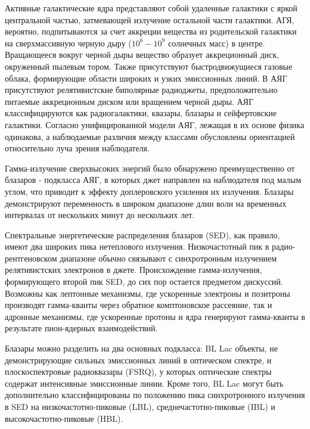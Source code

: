 Активные галактические ядра представляют собой удаленные галактики с яркой центральной частью, затмевающей излучение остальной части галактики. АГЯ, вероятно, подпитываются за счет аккреции вещества из родительской галактики на сверхмассивную черную дыру ($10^6-10^9$ солнечных масс) в центре. Вращающееся вокруг черной дыры вещество образует аккреционный диск, окруженный пылевым тором. Также присутствуют быстродвижущиеся газовые облака, формирующие области широких и узких эмиссионных линий. В АЯГ присутствуют релятивистские биполярные радиоджеты, предположительно питаемые аккреционным диском или вращением черной дыры\cite{BLANFORD_1977, BLANFORD_1982}. АЯГ классифицируются как радиогалактики, квазары, блазары и сейфертовские галактики. Согласно унифицированной модели АЯГ\cite{AGN_classification_1993, AGN_classification_1995}, лежащая в их основе физика одинакова, а наблюдаемые различия между классами обусловлены ориентацией относительно луча зрения наблюдателя.

Гамма-излучение сверхвысоких энергий было обнаружено преимущественно от блазаров - подкласса АЯГ, в которых джет направлен на наблюдателя под малым углом, что приводит к эффекту доплеровского усиления их излучения. Блазары демонстрируют переменность в широком диапазоне длин волн на временных интервалах от нескольких минут до нескольких лет.

Спектральные энергетические распределения блазаров (SED), как правило, имеют два широких пика нетеплового излучения. Низкочастотный пик в радио-рентгеновском диапазоне обычно связывают с синхротронным излучением релятивистских электронов в джете. Происхождение гамма-излучения, формирующего второй пик SED, до сих пор остается предметом дискуссий. Возможны как лептонные механизмы, где ускоренные электроны и позитроны производят гамма-кванты через обратное комптоновское рассеяние\cite{JET_COMPTONIZATION}, так и адронные механизмы, где ускоренные протоны и ядра генерируют гамма-кванты в результате пион-ядерных взаимодействий\cite{HADRONS_BLARARS, Aharonian_BLAZARS}.

Блазары можно разделить на два основных подкласса: BL Lac объекты, не демонстрирующие сильных эмиссионных линий в оптическом спектре, и плоскоспектровые радиоквазары (FSRQ), у которых оптические спектры содержат интенсивные эмиссионные линии. Кроме того, BL Lac могут быть дополнительно классифицированы по положению пика синхротронного излучения в SED на низкочастотно-пиковые (LBL), среднечастотно-пиковые (IBL) и высокочастотно-пиковые (HBL)\cite{Fossati_1998}.

